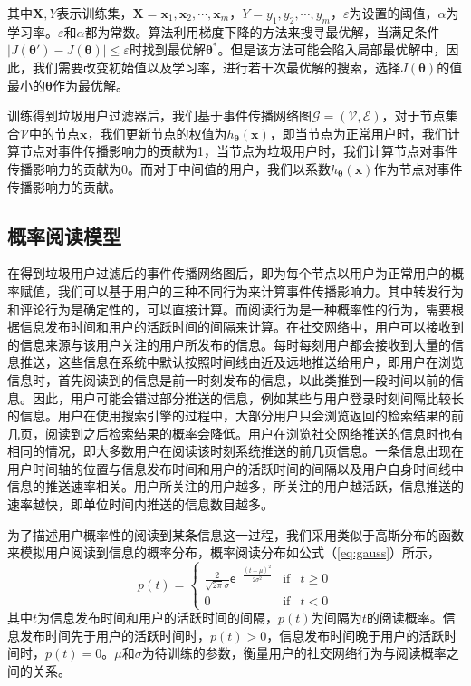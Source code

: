 其中$\mathbf{X},Y$表示训练集，$\mathbf{X}={\mathbf{x}_1, \mathbf{x}_2, \cdots, \mathbf{x}_m}$，$Y = {y_1, y_2, \cdots, y_m}$，$\varepsilon$为设置的阈值，$\alpha$为学习率。$\varepsilon$和$\alpha$都为常数。算法利用梯度下降的方法来搜寻最优解，当满足条件$\vert J\left(\bm{\theta}'\right) - J\left(\bm{\theta}\right)\vert \leq \varepsilon$时找到最优解$\bm{\theta}^{\ast}$。但是该方法可能会陷入局部最优解中，因此，我们需要改变初始值以及学习率，进行若干次最优解的搜索，选择$J\left(\bm{\theta}\right)$的值最小的$\bm{\theta}$作为最优解。

训练得到垃圾用户过滤器后，我们基于事件传播网络图$\mathcal{G}=\left(\mathcal{V},\mathcal{E}\right)$，对于节点集合$\mathcal{V}$中的节点$\mathbf{x}$，我们更新节点的权值为$h_ {\bm{\theta}} \left(\mathbf{x}\right)$，即当节点为正常用户时，我们计算节点对事件传播影响力的贡献为1，当节点为垃圾用户时，我们计算节点对事件传播影响力的贡献为0。而对于中间值的用户，我们以系数$h_ {\bm{\theta}} \left(\mathbf{x}\right)$作为节点对事件传播影响力的贡献。

\subsection{概率阅读模型}
\label{subsec5:readModel}
在得到垃圾用户过滤后的事件传播网络图后，即为每个节点以用户为正常用户的概率赋值，我们可以基于用户的三种不同行为来计算事件传播影响力。其中转发行为和评论行为是确定性的，可以直接计算。而阅读行为是一种概率性的行为，需要根据信息发布时间和用户的活跃时间的间隔来计算。在社交网络中，用户可以接收到的信息来源与该用户关注的用户所发布的信息。每时每刻用户都会接收到大量的信息推送，这些信息在系统中默认按照时间线由近及远地推送给用户，即用户在浏览信息时，首先阅读到的信息是前一时刻发布的信息，以此类推到一段时间以前的信息。因此，用户可能会错过部分推送的信息，例如某些与用户登录时刻间隔比较长的信息。用户在使用搜索引擎的过程中，大部分用户只会浏览返回的检索结果的前几页，阅读到之后检索结果的概率会降低。用户在浏览社交网络推送的信息时也有相同的情况，即大多数用户在阅读该时刻系统推送的前几页信息。一条信息出现在用户时间轴的位置与信息发布时间和用户的活跃时间的间隔以及用户自身时间线中信息的推送速率相关。用户所关注的用户越多，所关注的用户越活跃，信息推送的速率越快，即单位时间内推送的信息数目越多。

为了描述用户概率性的阅读到某条信息这一过程，我们采用类似于高斯分布的函数来模拟用户阅读到信息的概率分布，概率阅读分布如公式（\ref{eq:gauss}）所示，
\begin{equation}
\label{eq:gauss}
	p\left(t\right) = \left\{ \begin{array}{rcl} \frac{2}{\sqrt{2 \pi} \sigma}\mathsf{e}^{-\frac{\left(t-\mu\right)^2}{2{\sigma}^2}} & \mbox{if} & t \geq 0 \\ 0 & \mbox{if} & t < 0  \end{array} \right.
\end{equation}
其中$t$为信息发布时间和用户的活跃时间的间隔，$p\left(t\right)$为间隔为$t$的阅读概率。信息发布时间先于用户的活跃时间时，$p\left(t\right) > 0$，信息发布时间晚于用户的活跃时间时，$p\left(t\right) = 0$。$\mu$和$\sigma$为待训练的参数，衡量用户的社交网络行为与阅读概率之间的关系。

